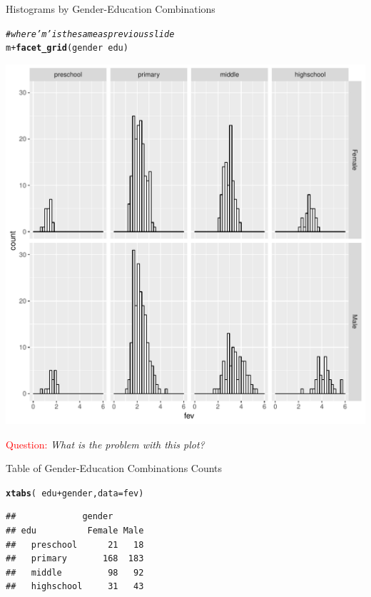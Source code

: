 \documentclass[10pt]{beamer}\usepackage[]{graphicx}\usepackage[]{color}
\makeatletter
\def\maxwidth{ %
  \ifdim\Gin@nat@width>\linewidth
    \linewidth
  \else
    \Gin@nat@width
  \fi
}
\newcommand{\hlcom}[1]{\textcolor[rgb]{0.678,0.584,0.686}{\textit{#1}}}%
\newcommand{\hlopt}[1]{\textcolor[rgb]{0,0,0}{#1}}%
\newcommand{\hlstd}[1]{\textcolor[rgb]{0.345,0.345,0.345}{#1}}%
\newcommand{\hlkwc}[1]{\textcolor[rgb]{0.333,0.667,0.333}{#1}}%
\newcommand{\hlkwd}[1]{\textcolor[rgb]{0.737,0.353,0.396}{\textbf{#1}}}%
\newenvironment{kframe}{%
 \def\at@end@of@kframe{}%
 \ifinner\ifhmode%
  \def\at@end@of@kframe{\end{minipage}}%
  \begin{minipage}{\columnwidth}%
 \fi\fi%
 \def\FrameCommand##1{\hskip\@totalleftmargin \hskip-\fboxsep
 \colorbox{shadecolor}{##1}\hskip-\fboxsep
     \hskip-\linewidth \hskip-\@totalleftmargin \hskip\columnwidth}%
 \MakeFramed {\advance\hsize-\width
   \@totalleftmargin\z@ \linewidth\hsize
   \@setminipage}}%
 {\par\unskip\endMakeFramed%
 \at@end@of@kframe}
\newenvironment{knitrout}{}{} %
\makeatother
\begin{document}
\begin{frame}[fragile]{Histograms by Gender-Education Combinations}

\begin{knitrout}
\color{fgcolor}\begin{kframe}
\begin{alltt}
\hlcom{# where 'm' is the same as previous slide}
\hlstd{m} \hlopt{+} \hlkwd{facet_grid}\hlstd{(gender} \hlopt{~} \hlstd{edu)}
\end{alltt}
\end{kframe}

{\centering \includegraphics[width=\maxwidth,height=.6\linewidth]{figure/unnamed-chunk-8-1} 

}



\end{knitrout}
\pause
\textcolor{red}{Question:} \textit{What is the problem with this plot?}

\end{frame}


\begin{frame}[fragile]{Table of Gender-Education Combinations Counts}

\begin{knitrout}
\color{fgcolor}\begin{kframe}
\begin{alltt}
\hlkwd{xtabs}\hlstd{(}\hlopt{~}\hlstd{edu} \hlopt{+} \hlstd{gender,} \hlkwc{data} \hlstd{= fev)}
\end{alltt}
\begin{verbatim}
##             gender
## edu          Female Male
##   preschool      21   18
##   primary       168  183
##   middle         98   92
##   highschool     31   43
\end{verbatim}
\end{kframe}
\end{knitrout}

\end{frame}
\end{document}

